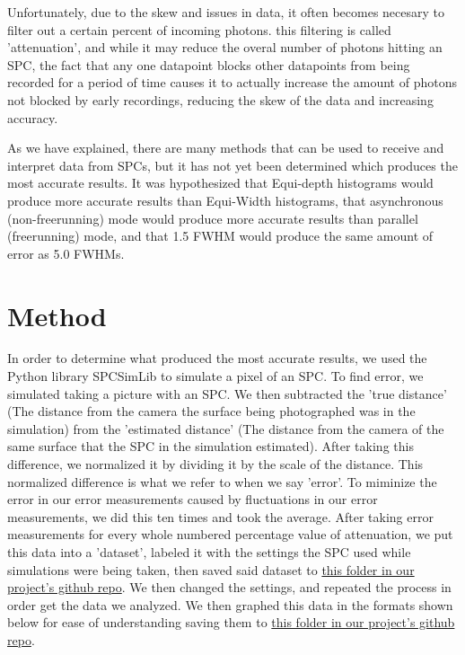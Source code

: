 \documentclass{article}
\begin{document}
Unfortunately, due to the skew and issues in data, it often becomes necesary to filter out a certain percent of incoming photons. this filtering is called 'attenuation', \cite{ingle} and while it may reduce the overal number of photons hitting an SPC, the fact that any one datapoint blocks other datapoints from being recorded for a period of time causes it to actually increase the amount of photons not blocked by early recordings, reducing the skew  of the data and increasing accuracy.  \cite{sadekar}

As we have explained, there are many methods that can be used to receive and interpret data from SPCs, but it has not yet been determined which produces the most accurate results. It was hypothesized that Equi-depth histograms would produce more accurate results than Equi-Width histograms, that asynchronous (non-freerunning) mode would produce more accurate results than parallel (freerunning) mode, and that 1.5 FWHM would produce the same amount of error as 5.0 FWHMs.

\section*{Method}
In order to determine what produced the most accurate results, we used the Python library SPCSimLib \cite{spc} to simulate a pixel of an SPC. To find error, we simulated taking a picture with an SPC. We then subtracted the 'true distance' (The distance from the camera the surface being photographed was in the simulation) from the 'estimated distance' (The distance from the camera of the same surface that the SPC in the simulation estimated). After taking this difference, we normalized it by dividing it by the scale of the distance. This normalized difference is what we refer to when we say 'error'. To miminize the error in our error measurements caused by fluctuations in our error measurements, we did this ten times and took the average. After taking error measurements for every whole numbered percentage value of attenuation, we put this data into a 'dataset', labeled it with the settings the SPC used while simulations were being taken, then saved said dataset to \href{https://github.com/yggaraxyg/SPCErrorLowerer/tree/master/RunData/runDataUsedInInitialProject}{this folder in our project's github repo}. We then changed the settings, and repeated the process in order get the data we analyzed. We then graphed this data in the formats shown below for ease of understanding saving them to \href{https://github.com/yggaraxyg/SPCErrorLowerer/tree/master/Graphs}{this folder in our project's github repo}.
\end{document}
